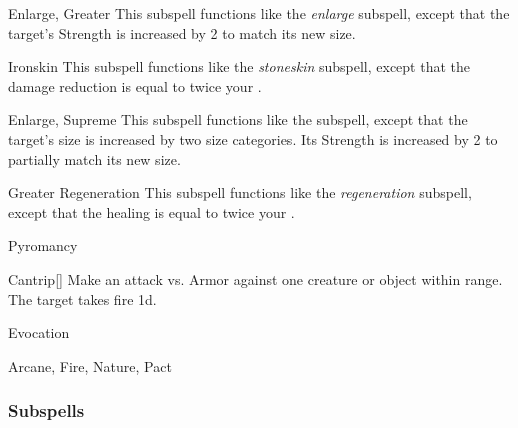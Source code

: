 \begin{ability}[\nth{5}]{Enlarge, Greater}
This subspell functions like the \textit{enlarge} subspell, except that the target's Strength is increased by 2 to match its new size.
\end{ability}
\vspace{0.25em}


\begin{ability}[\nth{6}]{Ironskin}
This subspell functions like the \textit{stoneskin} subspell, except that the damage reduction is equal to twice your .
\end{ability}
\vspace{0.25em}


\begin{ability}[\nth{7}]{Enlarge, Supreme}
This subspell functions like the  subspell, except that the target's size is increased by two size categories.
Its Strength is increased by 2 to partially match its new size.
\end{ability}
\vspace{0.25em}


\begin{ability}[\nth{7}]{Greater Regeneration}
This subspell functions like the \textit{regeneration} subspell, except that the healing is equal to twice your .
\end{ability}
\vspace{0.25em}

\newpage
\begin{spellsection}{Pyromancy}

\begin{spellheader}
\end{spellheader}


\begin{ability}{Cantrip}[]
Make an attack vs. Armor against one creature or object within \rngmed range.
\hit The target takes fire  \minus1d.
\end{ability}




 Evocation

 Arcane, Fire, Nature, Pact
\end{spellsection}


\subsubsection{Subspells}


